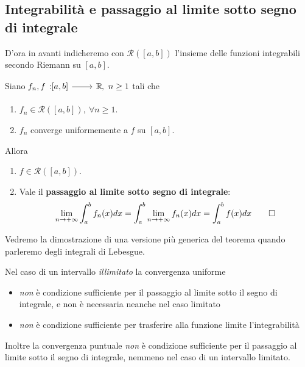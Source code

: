 \subsection{Integrabilità e passaggio al limite sotto segno di integrale}
D'ora in avanti indicheremo con $\mathcal{R}\left(\left[a,b\right]\right)$ l'insieme delle funzioni integrabili secondo Riemann su $[a,b]$.
\begin{theoremaqed}\label{passaggioallimitecontinuitàuniforme}
	Siano $\funz{f_n,f}{\left[a,b\right]}{\realset},\ n\geq 1$ tali che
	\begin{enumerate}
		\item $f_n\in\mathcal{R}\left(\left[a,b\right]\right),\ \forall n\geq 1$.
		\item $f_n$ converge uniformemente a $f$ su $\left[a,b\right]$.
	\end{enumerate}
	Allora
	\begin{enumerate}
		\item $f\in\mathcal{R}\left(\left[a,b\right]\right)$.
		\item Vale il \textbf{passaggio al limite sotto segno di integrale}:
		\begin{equation}
			\lim_{n\to+\infty}\int_{a}^{b}f_n(x)dx=\int_{a}^{b}\lim_{n\to+\infty}f_n(x)dx=\int_{a}^{b}f(x)dx\qedhere
		\end{equation}
	\end{enumerate}
\end{theoremaqed}
Vedremo la dimostrazione di una versione più generica del teorema quando parleremo degli integrali di Lebesgue.
\begin{observe}
	Nel caso di un intervallo \textit{illimitato} la convergenza uniforme 
	\begin{itemize}
		\item \textit{non} è condizione sufficiente per il passaggio al limite sotto il segno di integrale, e non è necessaria neanche nel caso limitato
		\item \textit{non} è condizione sufficiente per trasferire alla funzione limite l'integrabilità
	\end{itemize}
	Inoltre la convergenza puntuale \textit{non} è condizione sufficiente per il passaggio al limite sotto il segno di integrale, nemmeno nel caso di un intervallo limitato.
\end{observe}
